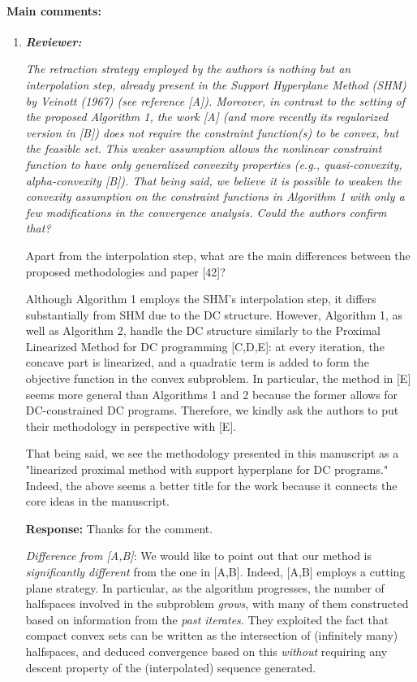 \documentclass{article}
\begin{document}
\paragraph{Main comments:}
\begin{enumerate}
   \item \textit{\textbf{Reviewer:}} {\it The retraction strategy employed by the authors is nothing but an interpolation step, already present in the Support Hyperplane Method (SHM) by Veinott (1967) (see reference [A]). Moreover, in contrast to the setting of the proposed Algorithm 1, the work [A] (and more recently its regularized version in [B]) does not require the constraint function(s) to be convex, but the feasible set. This weaker assumption allows the nonlinear constraint function to have only generalized convexity properties (e.g., quasi-convexity, alpha-convexity [B]). That being said, we believe it is possible to weaken the convexity assumption on the constraint functions in Algorithm 1 with only a few modifications in the convergence analysis. Could the authors confirm that?

       Apart from the interpolation step, what are the main differences between the proposed methodologies and paper [42]?

Although Algorithm 1 employs the SHM's interpolation step, it differs substantially from SHM due to the DC structure. However, Algorithm 1, as well as Algorithm 2, handle the DC structure similarly to the Proximal Linearized Method for DC programming [C,D,E]: at every iteration, the concave part is linearized, and a quadratic term is added to form the objective function in the convex subproblem. In particular, the method in [E] seems more general than Algorithms 1 and 2 because the former allows for DC-constrained DC programs. Therefore, we kindly ask the authors to put their methodology in perspective with [E].

That being said, we see the methodology presented in this manuscript as a "linearized proximal method with support hyperplane for DC programs."
Indeed, the above seems a better title for the work because it connects the core ideas in the manuscript.}

    \textbf{Response:} Thanks for the comment.

    {\it Difference from [A,B]}: We would like to point out that our method is {\it significantly different} from the one in [A,B]. Indeed, [A,B] employs a cutting plane strategy. In particular, as the algorithm progresses, the number of halfspaces involved in the subproblem {\em grows}, with many of them constructed based on information from the \emph{past iterates}. They exploited the fact that compact convex sets can be written as the intersection of (infinitely many) halfspaces, and deduced convergence based on this {\em without} requiring any descent property of the (interpolated) sequence generated.


\end{enumerate}
\end{document}
